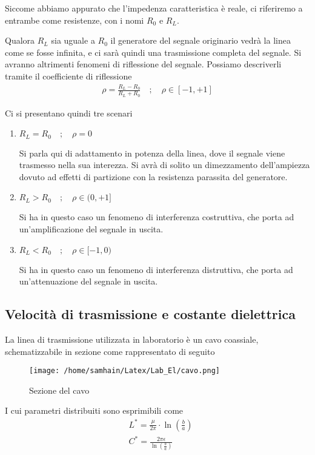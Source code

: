 \documentclass[]{report}
\newcommand{\spacer}{\quad ; \quad}
\begin{document}
Siccome abbiamo appurato che l'impedenza caratteristica è reale, ci riferiremo a entrambe come resistenze, con i nomi $R_0$ e $R_L$.

Qualora $R_L$ sia uguale a $R_0$ il generatore del segnale originario vedrà la linea come se fosse infinita, e ci sarà quindi una trasmissione completa del segnale. Si avranno altrimenti fenomeni di riflessione del segnale. Possiamo descriverli tramite il coefficiente di riflessione
\begin{align}
\rho = \frac{R_L - R_0}{R_L + R_0} \spacer \rho \in [-1 ,+1]
\end{align} 

Ci si presentano quindi tre scenari
\begin{enumerate}
	\item $R_L =R_0 \spacer \rho = 0$
	
	Si parla qui di adattamento in potenza della linea, dove il segnale viene trasmesso nella sua interezza. Si avrà di solito un dimezzamento dell'ampiezza dovuto ad effetti di partizione con la resistenza parassita del generatore.
	
	\item $R_L > R_0 \spacer \rho \in (0,+1]$
	
	Si ha in questo caso un fenomeno di interferenza costruttiva, che porta ad un'amplificazione del segnale in uscita.
	
	\item $R_L < R_0 \spacer \rho \in [-1,0)$
	
	Si ha in questo caso un fenomeno di interferenza distruttiva, che porta ad un'attenuazione del segnale in uscita.	
\end{enumerate}

\newpage

\subsection{Velocità di trasmissione e costante dielettrica}
La linea di trasmissione utilizzata in laboratorio è un cavo coassiale, schematizzabile in sezione come rappresentato di seguito
\begin{figure}[!htb]
	\centering
	\texttt{[image: /home/samhain/Latex/Lab\_El/cavo.png]}
	\label{ergwg}
	\caption{\label{luegregegl} \small Sezione del cavo}
\end{figure}


I cui parametri distribuiti sono esprimibili come
\begin{align}
&L^* = \frac{\mu}{2\pi}\cdot \ln \left(\frac{b}{a}\right)\\
&C^* = \frac{2\pi \epsilon}{\ln \left(\frac{b}{a}\right)}
\end{align}
\end{document}
